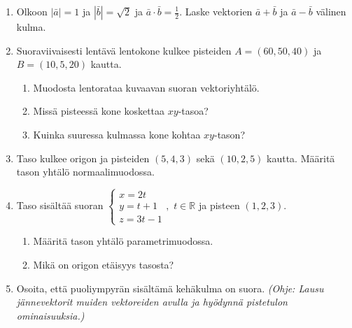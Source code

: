 \documentclass[12pt,fleqn]{article}
\begin{document}
\begin{enumerate}[label=\textbf{\arabic*.}]
\item Olkoon \(|\bar{a}|=1\) ja \(|\bar{b}|=\sqrt{2}\) ja \(\bar{a}\cdot \bar{b}=\frac{1}{2}\). Laske vektorien \(\bar{a}+\bar{b}\) ja \(\bar{a}-\bar{b}\) välinen kulma.

\item Suoraviivaisesti lentävä lentokone kulkee pisteiden \(A=(60,50,40)\) ja \(B=(10,5,20)\) kautta.
\begin{enumerate}[label=\textbf{\alph*)}]
\item Muodosta lentorataa kuvaavan suoran vektoriyhtälö.
\item Missä pisteessä kone koskettaa \(xy\)-tasoa?
\item Kuinka suuressa kulmassa kone kohtaa \(xy\)-tason?
\end{enumerate}

\item Taso kulkee origon ja pisteiden \((5,4,3)\) sekä \((10,2,5)\) kautta. Määritä tason yhtälö normaalimuodossa.

\item Taso sisältää suoran \(
\begin{cases}
x=2t \\
y=t+1 \\
z=3t-1
\end{cases},\) \(t\in \mathbb{R}\) ja pisteen \((1,2,3)\).
\begin{enumerate}[label=\textbf{\alph*)}]
\item Määritä tason yhtälö parametrimuodossa.
\item Mikä on origon etäisyys tasosta?
\end{enumerate}

\item Osoita, että puoliympyrän sisältämä kehäkulma on suora. \emph{(Ohje: Lausu jännevektorit muiden vektoreiden avulla ja hyödynnä pistetulon ominaisuuksia.)}

\end{enumerate}
\end{document}
